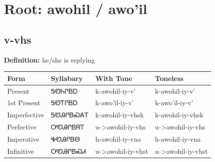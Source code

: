 \documentclass{article}%
\begin{document}
%
\normalsize%
\section*{Root: awohil / awo'il}%
\subsection*{v-vhs}%
\textbf{Definition: }%
he/she is replying%
\\[0.5em]%
\begin{tabular}{|l|l|l|l|}%
\hline%
\textbf{Form}&\textbf{Syllabary}&\textbf{With Tone}&\textbf{Toneless}\\%
\hline%
Present&ᎦᏬᏂᎵᏴᎠ&k{-}awohil{-}iy{-}v'&k{-}awohil{-}iy{-}v'\\%
1st Present&ᎦᏬᎢᎵᏴᎠ&k{-}awo'il{-}iy{-}v'&k{-}awo'il{-}iy{-}v'\\%
Imperfective&ᎦᏬᎯᎵᏴᏍᎪᎢ&k{-}awohil{-}iy{-}vhsk&k{-}awohil{-}iy{-}vhsk\\%
Perfective&ᎤᏬᎯᎵᏴᏒᎢ&u{-}>awohil{-}iy{-}vhs&u{-}>awohil{-}iy{-}vhs\\%
Imperative&ᎭᏬᎯᎵᏴᎾ&h{-}awohil{-}iy{-}vna&h{-}awohil{-}iy{-}vna\\%
Infinitive&ᎤᏬᎯᎵᏴᏍᏗ&u{-}>awohil{-}iy{-}vhst&u{-}>awohil{-}iy{-}vhst\\%
\hline%
\end{tabular}%
\\[1em]%
\end{document}
